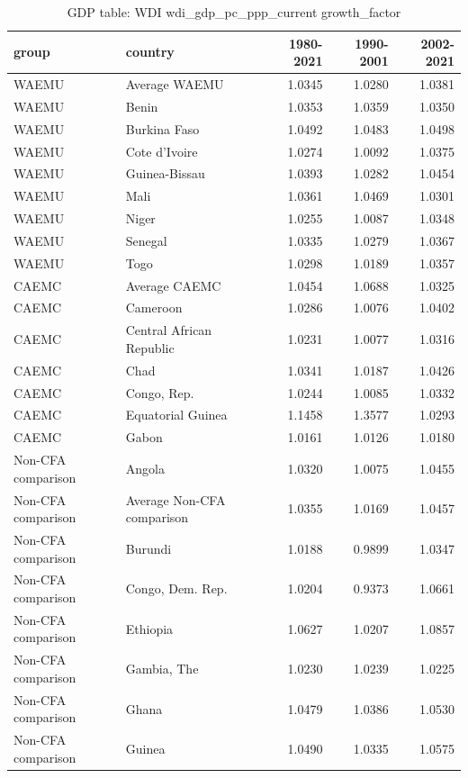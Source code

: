 \begin{table}

\caption{GDP table: WDI wdi_gdp_pc_ppp_current growth_factor}
\centering
\begin{tabular}[t]{llrrr}
\toprule
group & country & 1980-2021 & 1990-2001 & 2002-2021\\
\midrule
WAEMU & Average WAEMU & 1.0345 & 1.0280 & 1.0381\\
WAEMU & Benin & 1.0353 & 1.0359 & 1.0350\\
WAEMU & Burkina Faso & 1.0492 & 1.0483 & 1.0498\\
WAEMU & Cote d'Ivoire & 1.0274 & 1.0092 & 1.0375\\
WAEMU & Guinea-Bissau & 1.0393 & 1.0282 & 1.0454\\
\addlinespace
WAEMU & Mali & 1.0361 & 1.0469 & 1.0301\\
WAEMU & Niger & 1.0255 & 1.0087 & 1.0348\\
WAEMU & Senegal & 1.0335 & 1.0279 & 1.0367\\
WAEMU & Togo & 1.0298 & 1.0189 & 1.0357\\
CAEMC & Average CAEMC & 1.0454 & 1.0688 & 1.0325\\
\addlinespace
CAEMC & Cameroon & 1.0286 & 1.0076 & 1.0402\\
CAEMC & Central African Republic & 1.0231 & 1.0077 & 1.0316\\
CAEMC & Chad & 1.0341 & 1.0187 & 1.0426\\
CAEMC & Congo, Rep. & 1.0244 & 1.0085 & 1.0332\\
CAEMC & Equatorial Guinea & 1.1458 & 1.3577 & 1.0293\\
\addlinespace
CAEMC & Gabon & 1.0161 & 1.0126 & 1.0180\\
Non-CFA comparison & Angola & 1.0320 & 1.0075 & 1.0455\\
Non-CFA comparison & Average Non-CFA comparison & 1.0355 & 1.0169 & 1.0457\\
Non-CFA comparison & Burundi & 1.0188 & 0.9899 & 1.0347\\
Non-CFA comparison & Congo, Dem. Rep. & 1.0204 & 0.9373 & 1.0661\\
\addlinespace
Non-CFA comparison & Ethiopia & 1.0627 & 1.0207 & 1.0857\\
Non-CFA comparison & Gambia, The & 1.0230 & 1.0239 & 1.0225\\
Non-CFA comparison & Ghana & 1.0479 & 1.0386 & 1.0530\\
Non-CFA comparison & Guinea & 1.0490 & 1.0335 & 1.0575\\

\end{tabular}
\end{table}
